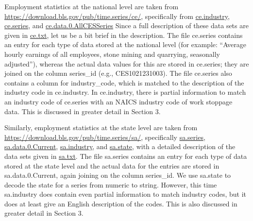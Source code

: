 \documentclass[reqno,11pt]{amsart}
\begin{document}
Employment statistics at the national level are taken from 
\url{https://download.bls.gov/pub/time.series/ce/},
specifically from 
\href{https://download.bls.gov/pub/time.series/ce/ce.industry}{ce.industry},
\href{https://download.bls.gov/pub/time.series/ce/ce.series}{ce.series},
and
\href{https://download.bls.gov/pub/time.series/ce/ce.data.0.AllCESSeries}{ce.data.0.AllCESSeries}
Since a full description of these data sets are given in 
\href{https://download.bls.gov/pub/time.series/ce/ce.txt}{ce.txt}, 
let us be a bit brief in the description. 
The file ce.series contains an entry for each type of data stored
at the national level (for example:
``Average hourly earnings of all employees, stone mining and quarrying, seasonally adjusted''),
whereas the actual data values for this are stored in 
ce.series; they are joined on the column series\_id (e.g., CES1021231003).
The file ce.series also contains a column for industry\_code, which is matched
to the description of the industry code in ce.industry. In ce.industry, there is
partial information to match an industry code of ce.series with an NAICS industry code of
work stoppage data. This is discussed in greater detail in Section 3.


Similarly, employment statistics at the state level are taken from 
\url{https://download.bls.gov/pub/time.series/sa/},
specifically
\href{https://download.bls.gov/pub/time.series/sa/sa.series}{sa.series},
\href{https://download.bls.gov/pub/time.series/sa/sa.data.0.Current}{sa.data.0.Current},
\href{https://download.bls.gov/pub/time.series/sa/sa.industry}{sa.industry},
and
\href{https://download.bls.gov/pub/time.series/sa/sa.state}{sa.state},
with a detailed description of the data sets given in
\href{https://download.bls.gov/pub/time.series/sa/sa.txt}{sa.txt}.
The file sa.series contains an entry for each type of data stored
at the state level and the actual data for the entries are stored in 
sa.data.0.Current, again joining on the column series\_id.
We use sa.state to decode the state for a series from numeric to string.
However, this time sa.industry does contain even partial information to 
match industry codes, but it does at least give an English description
of the codes. This is also discussed in greater detail in Section 3.
\end{document}
